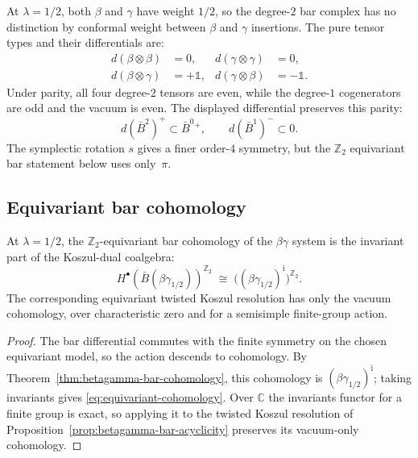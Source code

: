 \begin{computation}[Degree-2 bar differential at \texorpdfstring{$\lambda = 1/2$}{lambda = 1/2}]
\label{comp:symplectic-degree2}
At $\lambda = 1/2$, both $\beta$ and $\gamma$ have weight $1/2$,
so the degree-$2$ bar complex has no distinction by conformal
weight between $\beta$ and $\gamma$ insertions. The pure tensor
types and their differentials are:
\begin{align*}
d(\beta \otimes \beta) &= 0, &
d(\gamma \otimes \gamma) &= 0, \\
d(\beta \otimes \gamma) &= +\mathbb{1}, &
d(\gamma \otimes \beta) &= -\mathbb{1}.
\end{align*}
Under parity, all four degree-$2$ tensors are even, while the
degree-$1$ cogenerators are odd and the vacuum is even. The displayed
differential preserves this parity:
\[
d(\bar B^2)^+ \subset \bar B^0{}^+,\qquad
d(\bar B^1)^- \subset 0.
\]
The symplectic rotation $s$ gives a finer order-$4$ symmetry, but the
$\mathbb Z_2$ equivariant bar statement below uses only~$\pi$.
\end{computation}

\subsection{Equivariant bar cohomology}

\begin{proposition}
\label{prop:symplectic-equivariant-cohomology}
At $\lambda = 1/2$, the $\mathbb{Z}_2$-equivariant bar
cohomology of the $\beta\gamma$ system is the invariant part of the
Koszul-dual coalgebra:
\begin{equation}\label{eq:equivariant-cohomology}
H^\bullet(\bar{B}(\beta\gamma_{1/2}))^{\mathbb{Z}_2}
\;\cong\;
\bigl((\beta\gamma_{1/2})^{\mathrm i}\bigr)^{\mathbb{Z}_2}.
\end{equation}
The corresponding equivariant twisted Koszul resolution has only the
vacuum cohomology, over characteristic zero and for a semisimple
finite-group action.
\end{proposition}

\begin{proof}
The bar differential commutes with the finite symmetry on the chosen
equivariant model, so the action descends to cohomology. By
Theorem~\ref{thm:betagamma-bar-cohomology}, this cohomology is
$(\beta\gamma_{1/2})^{\mathrm i}$; taking invariants gives
\eqref{eq:equivariant-cohomology}. Over $\mathbb C$ the invariants
functor for a finite group is exact, so applying it to the twisted
Koszul resolution of Proposition~\ref{prop:betagamma-bar-acyclicity}
preserves its vacuum-only cohomology.\qedhere
\end{proof}

